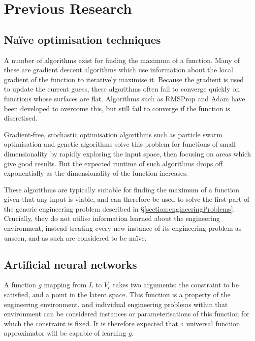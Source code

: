 \documentclass[../../main.tex]{subfiles}
\begin{document}
\chapter{Previous Research} \label{chapter:previousResearch}

\section{Na\"{i}ve optimisation techniques} \label{section:naiveOptimisationTechniques}

A number of algorithms exist for finding the maximum of a function.
Many of these are gradient descent algorithms \cite{ruder17} which use information about the local gradient of the function to iteratively maximise it.
Because the gradient is used to update the current guess, these algorithms often fail to converge quickly on functions whose surfaces are flat.
Algorithms such as RMSProp \cite{hinton17} and Adam \cite{kingma17} have been developed to overcome this, but still fail to converge if the function is discretised.

Gradient-free, stochastic optimisation algorithms such as particle swarm optimisation \cite{kennedy12} and genetic algorithms \cite{carr14} solve this problem for functions of small dimensionality by rapidly exploring the input space, then focusing on areas which give good results.
But the expected runtime of such algorithms drops off exponentially as the dimensionality of the function increases.

These algorithms are typically suitable for finding the maximum of a function given that any input is viable, and can therefore be used to solve the first part of the generic engineering problem described in \S\ref{section:engineeringProblems}.
Crucially, they do not utilise information learned about the engineering environment, instead treating every new instance of its engineering problem as unseen, and as such are considered to be na\"{i}ve.

\section{Artificial neural networks} \label{section:artificialNeuralNetworks}

A function $g$ mapping from $L$ to $V_c$ takes two arguments: the constraint to be satisfied, and a point in the latent space.
This function is a property of the engineering environment, and individual engineering problems within that environment can be considered instances or parameterisations of this function for which the constraint is fixed.
It is therefore expected that a universal function approximator will be capable of learning $g$.
\end{document}
